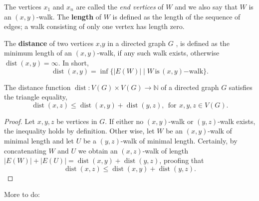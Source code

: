 The vertices $x_1$ and $x_n$ are called the \textit{end vertices} of
$W$ and we also say that $W$ is an $(x,y)$-walk. The \textbf{length}
of $W$ is defined as the length of the sequence of edges; a walk
consisting of only one vertex has length zero. 


\begin{defn}[Distance]
  The \textbf{distance} of two vertices $x$,$y$ in a directed graph
  $G$ , is defined as the minimum length of an
  $(x,y)$-walk, if any such walk exists, otherwise
  $\operatorname{dist}(x,y)=\infty$. In short,
  \[
  \operatorname{dist}(x,y) = \inf \{|E(W)| \mid
  W\,\mathrm{is}\,(x,y)\mathrm{-walk}\}.
  \]
\end{defn}

\begin{proposition}
  The distance function $\operatorname{dist}: V(G) \times V(G) \to
  \mathbb{N}$ of a directed graph $G$ satisfies the triangle equality,
  \[
  \operatorname{dist}(x,z) \le \operatorname{dist}(x,y) +
  \operatorname{dist}(y,z), \:\: \mathrm{for}\:\, x,y,z \in V(G).
  \]
\end{proposition}

\begin{proof}
  Let $x,y,z$ be vertices in $G$. If either no $(x,y)$-walk or
  $(y,z)$-walk exists, the inequality holds by definition. Other wise,
  let $W$ be an $(x,y)$-walk of minimal length and let $U$ be a
  $(y,z)$-walk of minimal length. Certainly, by concatenating $W$ and
  $U$ we obtain an $(x,z)$-walk of length $|E(W)| + |E(U)| =
  \operatorname{dist}(x,y) + \operatorname{dist}(y,z)$, proofing
  that \[ \operatorname{dist}(x,z) \le \operatorname{dist}(x,y) +
  \operatorname{dist}(y,z).
  \]
\end{proof}







More to do:

